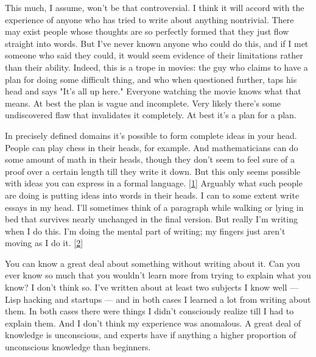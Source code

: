 This
                  much, I assume, won't be that controversial. I think it will
                  accord with the experience of anyone who has tried to write
                  about anything nontrivial. There may exist people whose
                  thoughts are so perfectly formed that they just flow straight
                  into words. But I've never known anyone who could do this, and
                  if I met someone who said they could, it would seem evidence
                  of their limitations rather than their ability. Indeed, this
                  is a trope in movies: the guy who claims to have a plan for
                  doing some difficult thing, and who when questioned further,
                  taps his head and says "It's all up here." Everyone watching
                  the movie knows what that means. At best the plan is vague and
                  incomplete. Very likely there's some undiscovered flaw that
                  invalidates it completely. At best it's a plan for a plan.

In
                  precisely defined domains it's possible to form complete ideas
                  in your head. People can play chess in their heads, for
                  example. And mathematicians can do some amount of math in
                  their heads, though they don't seem to feel sure of a proof
                  over a certain length till they write it down. But this only
                  seems possible with ideas you can express in a formal
                  language.
                  [\href{\#f1n}{1}]
                  Arguably what such people are doing is putting ideas into
                  words in their heads. I can to some extent write essays in my
                  head. I'll sometimes think of a paragraph while walking or
                  lying in bed that survives nearly unchanged in the final
                  version. But really I'm writing when I do this. I'm doing the
                  mental part of writing; my fingers just aren't moving as I do
                  it.
                  [\href{\#f2n}{2}]

You can know a great deal about something without
                  writing about it. Can you ever know so much that you wouldn't
                  learn more from trying to explain what you know? I don't think
                  so. I've written about at least two subjects I know well
                  --- Lisp hacking and startups --- and in both cases I
                  learned a lot from writing about them. In both cases there
                  were things I didn't consciously realize till I had to explain
                  them. And I don't think my experience was anomalous. A great
                  deal of knowledge is unconscious, and experts have if anything
                  a higher proportion of unconscious knowledge than
                  beginners.

